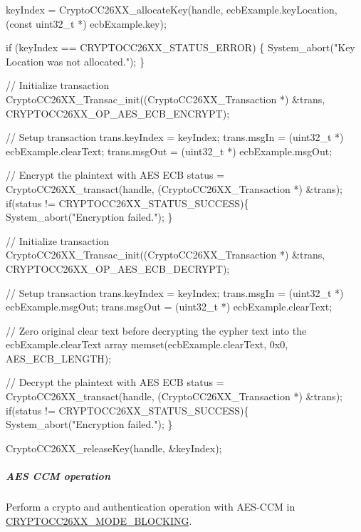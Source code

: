 \begin{DoxyCode}
keyIndex = CryptoCC26XX_allocateKey(handle, ecbExample.keyLocation,
                                                                   (\textcolor{keyword}{const} uint32\_t *) ecbExample.key);

\textcolor{keywordflow}{if} (keyIndex == CRYPTOCC26XX_STATUS_ERROR) \{
        System\_abort(\textcolor{stringliteral}{"Key Location was not allocated."});
\}

\textcolor{comment}{// Initialize transaction}
CryptoCC26XX_Transac_init((CryptoCC26XX_Transaction *) &trans, 
      CRYPTOCC26XX_OP_AES_ECB_ENCRYPT);

\textcolor{comment}{// Setup transaction}
trans.keyIndex         = keyIndex;
trans.msgIn            = (uint32\_t *) ecbExample.clearText;
trans.msgOut           = (uint32\_t *) ecbExample.msgOut;


\textcolor{comment}{// Encrypt the plaintext with AES ECB}
status = CryptoCC26XX_transact(handle, (CryptoCC26XX_Transaction *) &trans);
\textcolor{keywordflow}{if}(status != CRYPTOCC26XX_STATUS_SUCCESS)\{
        System\_abort(\textcolor{stringliteral}{"Encryption failed."});
\}

\textcolor{comment}{// Initialize transaction}
CryptoCC26XX_Transac_init((CryptoCC26XX_Transaction *) &trans, 
      CRYPTOCC26XX_OP_AES_ECB_DECRYPT);

\textcolor{comment}{// Setup transaction}
trans.keyIndex         = keyIndex;
trans.msgIn            = (uint32\_t *) ecbExample.msgOut;
trans.msgOut           = (uint32\_t *) ecbExample.clearText;

\textcolor{comment}{// Zero original clear text before decrypting the cypher text into the ecbExample.clearText array}
memset(ecbExample.clearText, 0x0, AES\_ECB\_LENGTH);

\textcolor{comment}{// Decrypt the plaintext with AES ECB}
status = CryptoCC26XX_transact(handle, (CryptoCC26XX_Transaction *) &trans);
\textcolor{keywordflow}{if}(status != CRYPTOCC26XX_STATUS_SUCCESS)\{
        System\_abort(\textcolor{stringliteral}{"Encryption failed."});
\}

CryptoCC26XX_releaseKey(handle, &keyIndex);
\end{DoxyCode}


\subparagraph*{A\+E\+S C\+C\+M operation}

Perform a crypto and authentication operation with A\+E\+S-\/\+C\+C\+M in \hyperlink{_crypto_c_c26_x_x_8h_abf86c8ac428559f00fed3299d439e2cdaf0a9faf35a12d014c5f3a475906a3373}{C\+R\+Y\+P\+T\+O\+C\+C26\+X\+X\+\_\+\+M\+O\+D\+E\+\_\+\+B\+L\+O\+C\+K\+I\+N\+G}.


